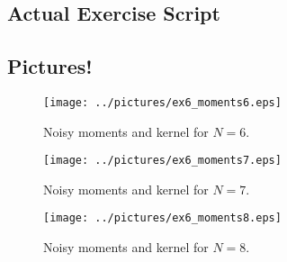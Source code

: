 \documentclass[11pt,a4paper]{report}
\begin{document}
\subsection{Actual Exercise Script}

\newpage

\subsection{Pictures!}

\begin{figure}[!ht]
    \centering
    \texttt{[image: ../pictures/ex6\_moments6.eps]}
    \caption{Noisy moments and kernel for $N = 6$.}
\end{figure}

\begin{figure}[!ht]
    \centering
    \texttt{[image: ../pictures/ex6\_moments7.eps]}
    \caption{Noisy moments and kernel for $N = 7$.}
\end{figure}

\begin{figure}[!ht]
    \centering
    \texttt{[image: ../pictures/ex6\_moments8.eps]}
    \caption{Noisy moments and kernel for $N = 8$.}
\end{figure}
\end{document}
